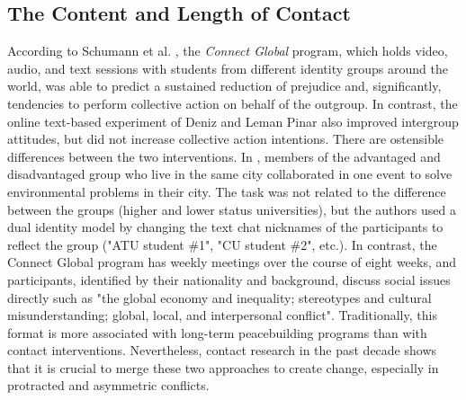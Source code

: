 \documentclass[dissertation,math,vertlayout,pdfa,colorlinks]{aaltoseries}
\begin{document}
\subsection{The Content and Length of Contact}
According to Schumann et al. \cite{schumannWhatCanBe2022}, the \textit{Connect Global} program, which holds video, audio, and text sessions with students from different identity groups around the world, was able to predict a sustained reduction of prejudice and, significantly, tendencies to perform collective action on behalf of the outgroup. In contrast, the online text-based experiment of Deniz and Leman Pinar \cite{enicOnlineContactsSupported2024} also improved intergroup attitudes, but did not increase collective action intentions. There are ostensible differences between the two interventions. In \cite{enicOnlineContactsSupported2024}, members of the advantaged and disadvantaged group who live in the same city collaborated in one event to solve environmental problems in their city. The task was not related to the difference between the groups (higher and lower status universities), but the authors used a dual identity model by changing the text chat nicknames of the participants to reflect the group ("ATU student \#1", "CU student \#2", etc.). In contrast, the Connect Global program has weekly meetings over the course of eight weeks, and participants, identified by their nationality and background, discuss social issues directly such as "the global economy and inequality; stereotypes and cultural misunderstanding; global, local, and interpersonal conflict". Traditionally, this format is more associated with long-term peacebuilding programs than with contact interventions. Nevertheless, contact research in the past decade shows that it is crucial to merge these two approaches to create change, especially in protracted and asymmetric conflicts.
\end{document}
